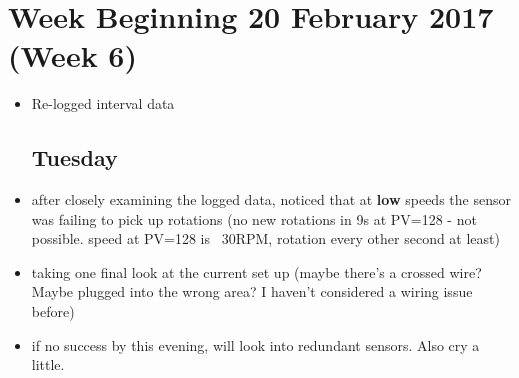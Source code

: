 \documentclass[a4]{report}
\begin{document}
	\section{Week Beginning 20 February 2017 (Week 6)}
	\begin{itemize}
		\subsection*{Monday}
		\item Re-logged interval data
		\subsection*{Tuesday}
		\item after closely examining the logged data, noticed that at \textbf{low} speeds the sensor was failing to pick up rotations (no new rotations in 9s at PV=128 - not possible. speed at PV=128 is ~30RPM, rotation every other second at least)
		\item taking one final look at the current set up (maybe there's a crossed wire? Maybe plugged into the wrong area? I haven't considered a wiring issue before)
		\item if no success by this evening, will look into redundant sensors. Also cry a little. 

	\end{itemize}
	\newpage
\end{document}
